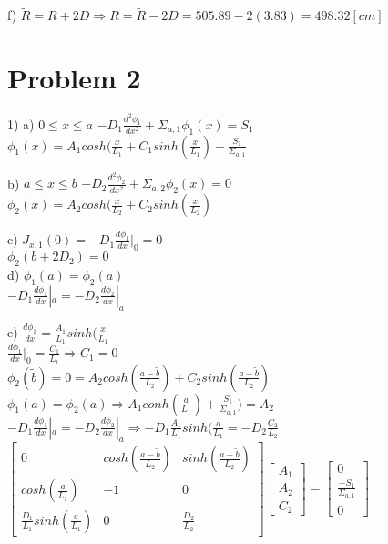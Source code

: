 \documentclass[12pt,fleqn, parskip=full]{scrartcl}
\begin{document}
f) $\tilde{R} = R + 2D \Rightarrow R = \tilde{R} - 2D = 505.89 - 2(3.83) = 498.32 [cm]$

\section{Problem 2}
1)
a) $0 \leq x \leq a$ \quad $-D_1\frac{d^2\phi_1}{dx^2} + \Sigma_{a,1} \phi_1(x) = S_1$\\

$\phi_1(x) = A_1cosh(\frac{x}{L_1}+C_1sinh(\frac{x}{L_1}) + \frac{S_1}{\Sigma_{a,1}}$

b) $a \leq x \leq b$ \quad $-D_2\frac{d^2\phi_2}{dx^2} + \Sigma_{a,2} \phi_2(x) = 0$\\

$\phi_2(x) = A_2cosh(\frac{x}{L_2}+C_2sinh(\frac{x}{L_2})$

c) $J_{x,1}(0) = -D_1\frac{d\phi_1}{dx}|_0 = 0$\\
$\phi_2(b + 2D_2) = 0$\\

d) $\phi_1(a) = \phi_2(a)$\\
$ -D_1\frac{d\phi_1}{dx}|_a = -D_2\frac{d\phi_2}{dx}|_a$

e) $\frac{d\phi_1}{dx} = \frac{A_1}{L_1}sinh(\frac{x}{L_1}$\\

$\frac{d\phi_1}{dx}|_0 = \frac{C_1}{L_1} \Rightarrow C_1 = 0$\\

$\phi_2(\tilde{b}) = 0 = A_2cosh(\frac{a-\tilde{b}}{L_2}) + C_2sinh(\frac{a-\tilde{b}}{L_2})$\\

$\phi_1(a) = \phi_2(a) \Rightarrow A_1conh(\frac{a}{L_1})+ \frac{S_1}{\Sigma_{a,1}}) = A_2$\\

$-D_1\frac{d\phi_1}{dx}|_a = -D_2\frac{d\phi_2}{dx}|_a \Rightarrow -D_1\frac{A_1}{L_1}sinh(\frac{a}{L_1} = -D_2\frac{C_2}{L_2}$\\

$\left[
\begin{array}{ccc}
	0 & cosh(\frac{a-\tilde{b}}{L_2})	& sinh(\frac{a-\tilde{b}}{L_2}) \\
	cosh(\frac{a}{L_1}) & -1 & 0 \\
	\frac{D_1}{L_1}sinh(\frac{a}{L_1}) & 0 & \frac{D_2}{L_2}
\end{array}
\right]
\left[
\begin{array}{c}
A_1 \\ A_2 \\ C_2
\end{array}
\right] = 
\left[
\begin{array}{c}
0 \\ \frac{-S_1}{\Sigma_{a,1}} \\ 0
\end{array}
\right]$\\
\end{document}
